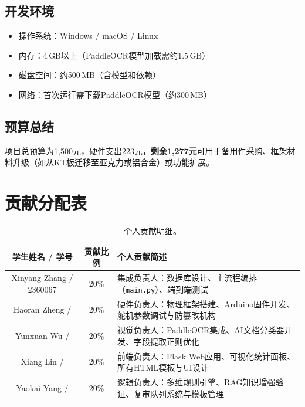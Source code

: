 \documentclass[conference]{IEEEtran}
\begin{document}
\subsection{开发环境}

\begin{itemize}[leftmargin=*]
    \item 操作系统：Windows / macOS / Linux
    \item 内存：4\,GB以上（PaddleOCR模型加载需约1.5\,GB）
    \item 磁盘空间：约500\,MB（含模型和依赖）
    \item 网络：首次运行需下载PaddleOCR模型（约300\,MB）
\end{itemize}

\subsection{预算总结}

项目总预算为1,500元，硬件支出223元，\textbf{剩余1,277元}可用于备用件采购、框架材料升级（如从KT板迁移至亚克力或铝合金）或功能扩展。

\section*{贡献分配表}

\begin{table}[H]
    \centering
    \caption{个人贡献明细。}
    \label{tab:contribution}
    \begin{tabular}{|c|c|p{6cm}|}
        \hline
        \textbf{学生姓名 / 学号} & \textbf{贡献比例} & \textbf{个人贡献简述} \\
        \hline
        Xinyang Zhang / 2360067 & 20\% & 集成负责人：数据库设计、主流程编排（\texttt{main.py}）、端到端测试 \\
        \hline
        Haoran Zheng / & 20\% & 硬件负责人：物理框架搭建、Arduino固件开发、舵机参数调试与防篡改机构 \\
        \hline
        Yunxuan Wu / & 20\% & 视觉负责人：PaddleOCR集成、AI文档分类器开发、字段提取正则优化 \\
        \hline
        Xiang Lin / & 20\% & 前端负责人：Flask Web应用、可视化统计面板、所有HTML模板与UI设计 \\
        \hline
        Yaokai Yang / & 20\% & 逻辑负责人：多维规则引擎、RAG知识增强验证、复审队列系统与模板管理 \\
        \hline
    \end{tabular}
\end{table}
\end{document}
